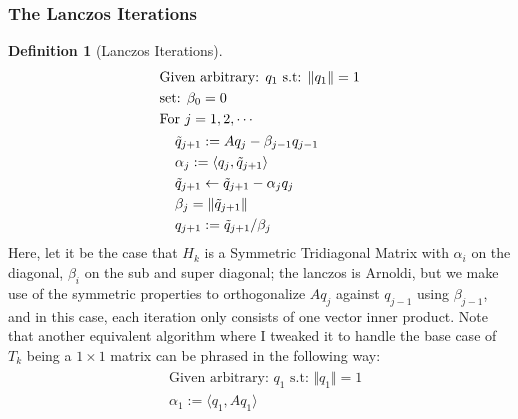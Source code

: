 \documentclass[]{article}
\theoremstyle{definition}
\newtheorem{definition}{Definition}
\begin{document}
        \subsubsection{The Lanczos Iterations}
            \begin{definition}[Lanczos Iterations]
                \begin{align}
                    & \text{Given arbitrary: } q_1 \text{ s.t: } \Vert q_1\Vert = 1
                    \\
                    & \text{set: }\beta_0 = 0
                    \\
                    & \text{For } j = 1, 2, \cdots 
                    \\
                    &\hspace{1.1em}\begin{aligned}
                        & \tilde{q}_{j + 1} := Aq_j - \beta_{j - 1}q_{j - 1}
                        \\
                        & \alpha_j := \langle q_j,\tilde{q}_{j + 1}\rangle
                        \\
                        & \tilde{q}_{j + 1} \leftarrow \tilde{q}_{j + 1} - \alpha_j q_j
                        \\
                        & \beta_j = \Vert \tilde{q}_{j + 1}\Vert
                        \\
                        & q_{j + 1} := \tilde{q}_{j + 1}/\beta_j
                    \end{aligned}
                \end{align}
                Here, let it be the case that $H_k$ is a Symmetric Tridiagonal Matrix with $\alpha_i$ on the diagonal, $\beta_i$ on the sub and super diagonal; the lanczos is Arnoldi, but we make use of the symmetric properties to orthogonalize $Aq_j$ against $q_{j - 1}$ using $\beta_{j-1}$, and in this case, each iteration only consists of one vector inner product. 
                Note that another equivalent algorithm where I tweaked it to handle the base case of $T_k$ being a $1\times 1 $ matrix can be phrased in the following way: 
                \begin{align}
                    \begin{aligned}
                        & \text{Given arbitrary: }q_1 \text{ s.t: } \Vert q_1\Vert = 1
                        \\
                        & \alpha_1 := \langle q_1, Aq_1\rangle
                        \\

\end{aligned}
\end{align}
\end{definition}
\end{document}
